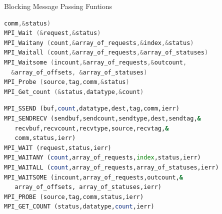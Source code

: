 \documentclass[10pt,t]{beamer}
\begin{document}
\begin{frame}{Blocking Message Passing Funtions}
\begin{block}{}
\begin{lstlisting}[basicstyle=\fontsize{5}{7}\ttfamily,language=C]
  comm,&status)
MPI_Wait (&request,&status)
MPI_Waitany (count,&array_of_requests,&index,&status)
MPI_Waitall (count,&array_of_requests,&array_of_statuses)
MPI_Waitsome (incount,&array_of_requests,&outcount,
  &array_of_offsets, &array_of_statuses)
MPI_Probe (source,tag,comm,&status)
MPI_Get_count (&status,datatype,&count)
  \end{lstlisting}
  \end{block}
  \vspace{-0.25cm}
  \begin{block}{}
  \begin{lstlisting}[basicstyle=\fontsize{5}{7}\selectfont\ttfamily,language=Fortran]
MPI_SSEND (buf,count,datatype,dest,tag,comm,ierr)
MPI_SENDRECV (sendbuf,sendcount,sendtype,dest,sendtag,&
   recvbuf,recvcount,recvtype,source,recvtag,&
   comm,status,ierr)
MPI_WAIT (request,status,ierr)
MPI_WAITANY (count,array_of_requests,index,status,ierr)
MPI_WAITALL (count,array_of_requests,array_of_statuses,ierr)
MPI_WAITSOME (incount,array_of_requests,outcount,&
   array_of_offsets, array_of_statuses,ierr)
MPI_PROBE (source,tag,comm,status,ierr)
MPI_GET_COUNT (status,datatype,count,ierr)
  \end{lstlisting}
  \end{block}
\end{frame}
\end{document}
